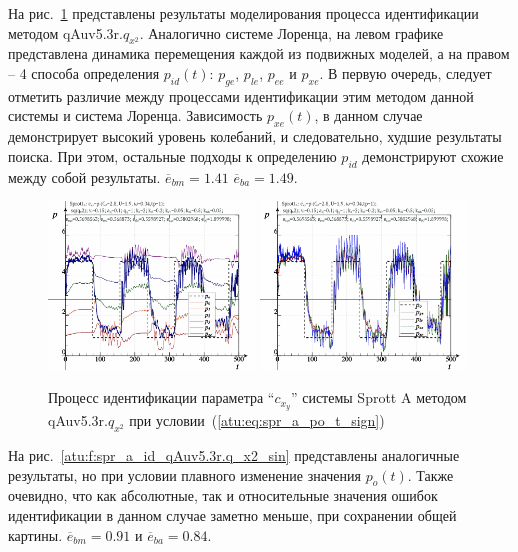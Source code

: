 На рис.~\ref{atu:f:spr_a_id_qAuv5.3r.q_x2_sign} представлены результаты
моделирования процесса идентификации
методом qAuv5.3r.$q_{x^2}$. Аналогично системе Лоренца, на левом графике представлена
динамика перемещения каждой из подвижных моделей,
а на правом -- 4 способа определения $p_{id}(t)$:
$p_{ge}$, $p_{le}$, $p_{ee}$ и $p_{xe}$.
В первую очередь, следует отметить различие между процессами
идентификации этим методом данной системы и система Лоренца.
Зависимость $p_{xe}(t)$, в данном случае демонстрирует
высокий уровень колебаний, и следовательно,
худшие результаты поиска. При этом,
остальные подходы к определению $p_{id}$
демонстрируют схожие между собой результаты.
$\overline{e}_{bm}=1.41$
$\overline{e}_{ba}=1.49$.


\begin{figure}[h!]
  \centerline{
    \includegraphics[width=0.49\textwidth]{p/cha/spr_a/qAuv5.3r/sprott_a_qAuv5_3r_qx2-p_t_pi_sign.png}
    \hfill
    \includegraphics[width=0.49\textwidth]{p/cha/spr_a/qAuv5.3r/sprott_a_qAuv5_3r_qx2-p_t_pz_sign.png}
  }
  \caption{Процесс идентификации параметра ``$c_{x_y}$'' системы Sprott A методом qAuv5.3r.$q_{x^2}$ при условии~(\ref{atu:eq:spr_a_po_t_sign})}
  \label{atu:f:spr_a_id_qAuv5.3r.q_x2_sign}
\end{figure}

На рис.~\ref{atu:f:spr_a_id_qAuv5.3r.q_x2_sin} представлены аналогичные результаты,
но при условии плавного изменение значения $p_o(t)$. Также очевидно, что
как абсолютные, так и относительные значения ошибок идентификации в данном случае заметно
меньше, при сохранении общей картины.
$\overline{e}_{bm}=0.91$
и
$\overline{e}_{ba}=0.84$.

